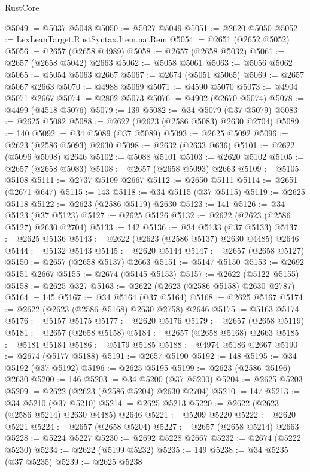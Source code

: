 \begin{lexlean}{RustCore}
\begin{coremodule}
@5049 := @5037 @5048
@5050 := @5027 @5049
@5051 := @2620 @5050
@5052 := LexLeanTarget.RustSyntax.Item.natRem
@5054 := @2651 (@2652 @5052)
@5056 := @2657 (@2658 @4989)
@5058 := @2657 (@2658 @5032)
@5061 := @2657 (@2658 @5042) @2663
@5062 := @5058 @5061
@5063 := @5056 @5062
@5065 := @5054 @5063 @2667
@5067 := @2674 (@5051 @5065)
@5069 := @2657 @5067 @2663
@5070 := @4988 @5069
@5071 := @4590 @5070
@5073 := @4904 @5071 @2667
@5074 := @2802 @5073
@5076 := @4902 (@2670 @5074)
@5078 := @4499 (@4518 @5076)
@5079 := 139
@5082 := @34 @5079 (@37 @5079)
@5083 := @2625 @5082
@5088 := @2622 (@2623 (@2586 @5083) @2630 @2704)
@5089 := 140
@5092 := @34 @5089 (@37 @5089)
@5093 := @2625 @5092
@5096 := @2623 (@2586 @5093) @2630
@5098 := @2632 (@2633 @636)
@5101 := @2622 (@5096 @5098) @2646
@5102 := @5088 @5101
@5103 := @2620 @5102
@5105 := @2657 (@2658 @5083)
@5108 := @2657 (@2658 @5093) @2663
@5109 := @5105 @5108
@5111 := @2737 @5109 @2667
@5112 := @2650 @5111
@5114 := @2651 (@2671 @647)
@5115 := 143
@5118 := @34 @5115 (@37 @5115)
@5119 := @2625 @5118
@5122 := @2623 (@2586 @5119) @2630
@5123 := 141
@5126 := @34 @5123 (@37 @5123)
@5127 := @2625 @5126
@5132 := @2622 (@2623 (@2586 @5127) @2630 @2704)
@5133 := 142
@5136 := @34 @5133 (@37 @5133)
@5137 := @2625 @5136
@5143 := @2622 (@2623 (@2586 @5137) @2630 @4485) @2646
@5144 := @5132 @5143
@5145 := @2620 @5144
@5147 := @2657 (@2658 @5127)
@5150 := @2657 (@2658 @5137) @2663
@5151 := @5147 @5150
@5153 := @2692 @5151 @2667
@5155 := @2674 (@5145 @5153)
@5157 := @2622 (@5122 @5155)
@5158 := @2625 @327
@5163 := @2622 (@2623 (@2586 @5158) @2630 @2787)
@5164 := 145
@5167 := @34 @5164 (@37 @5164)
@5168 := @2625 @5167
@5174 := @2622 (@2623 (@2586 @5168) @2630 @2758) @2646
@5175 := @5163 @5174
@5176 := @5157 @5175
@5177 := @2620 @5176
@5179 := @2657 (@2658 @5119)
@5181 := @2657 (@2658 @5158)
@5184 := @2657 (@2658 @5168) @2663
@5185 := @5181 @5184
@5186 := @5179 @5185
@5188 := @4974 @5186 @2667
@5190 := @2674 (@5177 @5188)
@5191 := @2657 @5190
@5192 := 148
@5195 := @34 @5192 (@37 @5192)
@5196 := @2625 @5195
@5199 := @2623 (@2586 @5196) @2630
@5200 := 146
@5203 := @34 @5200 (@37 @5200)
@5204 := @2625 @5203
@5209 := @2622 (@2623 (@2586 @5204) @2630 @2704)
@5210 := 147
@5213 := @34 @5210 (@37 @5210)
@5214 := @2625 @5213
@5220 := @2622 (@2623 (@2586 @5214) @2630 @4485) @2646
@5221 := @5209 @5220
@5222 := @2620 @5221
@5224 := @2657 (@2658 @5204)
@5227 := @2657 (@2658 @5214) @2663
@5228 := @5224 @5227
@5230 := @2692 @5228 @2667
@5232 := @2674 (@5222 @5230)
@5234 := @2622 (@5199 @5232)
@5235 := 149
@5238 := @34 @5235 (@37 @5235)
@5239 := @2625 @5238

\end{coremodule}
\end{lexlean}
